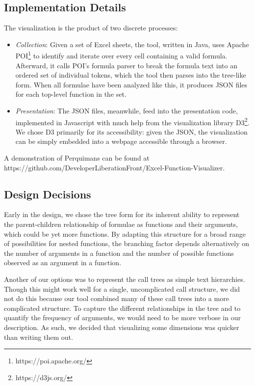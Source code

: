 \documentclass[conference]{IEEEtran}
\newcommand{\toolname}{Perquimans\xspace} \newcommand{\toolnameend}{Perquimans}
\begin{document}
	\subsection{Implementation Details} The visualization is the product of two
	discrete processes: \begin{itemize} \item \textit{Collection}: Given a set of
		Excel sheets, the tool, written in Java, uses Apache
		POI\footnote{https://poi.apache.org/} to identify and iterate over every cell
		containing a valid formula. Afterward, it calls POI's formula parser to break
		the formula text into an ordered set of individual tokens, which the tool then
		parses into the tree-like form. When all formulae have been analyzed like this,
		it produces JSON files for each top-level function in the set.
		
		\item \textit{Presentation}: The JSON files, meanwhile, feed into the
		presentation code, implemented in Javascript with much help from the
		visualization library D3\footnote{https://d3js.org/}. We chose D3 primarily
		for its accessibility: given the JSON, the visualization can be simply
		embedded into a webpage accessible through a browser. \end{itemize} A
	demonstration of \toolname can be found at
	https://github.com/DeveloperLiberationFront/Excel-Function-Visualizer.
	
	\subsection{Design Decisions} \label{ssec:decisions} Early in the design, we
	chose the tree form for its inherent ability to represent the parent-children
	relationship of formulae as functions and their arguments, which could be yet
	more functions. By adapting this structure for a broad range of possibilities
	for nested functions, the branching factor depends alternatively on the number
	of arguments in a function and the number of possible functions observed as an
	argument in a function. \par
	
	Another of our options was to represent the call trees as simple text
	hierarchies. Though this might work well for a single, uncomplicated call
	structure, we did not do this because our tool combined many of these call
	trees into a more complicated structure. To capture the different relationships
	in the tree and to quantify the frequency of arguments, we would need to be
	more verbose in our description. As such, we decided that visualizing some
	dimensions was quicker than writing them out. \par
	
\end{document}
